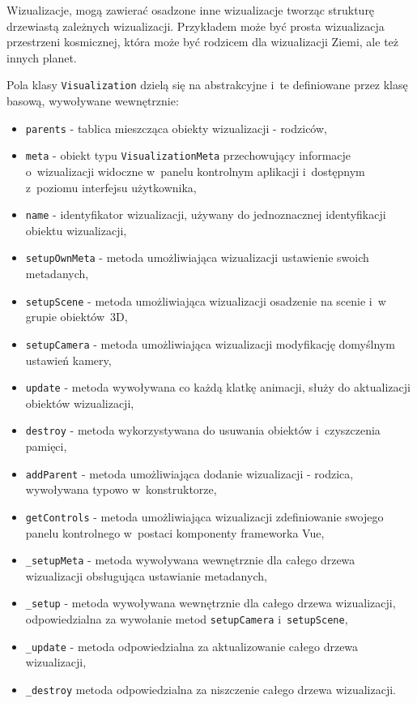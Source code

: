 Wizualizacje, mogą zawierać osadzone inne wizualizacje tworząc strukturę drzewiastą zależnych wizualizacji. Przykładem może być prosta wizualizacja przestrzeni kosmicznej, która może być rodzicem dla wizualizacji Ziemi, ale też innych planet.
\begin{samepage}
    Pola klasy \texttt{Visualization} dzielą się na abstrakcyjne i~te definiowane przez klasę basową, wywoływane wewnętrznie:


    \begin{itemize}
        \item \texttt{parents} - tablica mieszcząca obiekty wizualizacji - rodziców,
        \item \texttt{meta} - obiekt typu \texttt{VisualizationMeta} przechowujący informacje o~wizualizacji widoczne w~panelu kontrolnym aplikacji i~dostępnym z~poziomu interfejsu użytkownika,
        \item \texttt{name} - identyfikator wizualizacji, używany do jednoznacznej identyfikacji obiektu wizualizacji,
        \item \texttt{setupOwnMeta} - metoda umożliwiająca wizualizacji ustawienie swoich metadanych,
        \item \texttt{setupScene} - metoda umożliwiająca wizualizacji osadzenie na scenie i~w grupie obiektów~3D,
        \item \texttt{setupCamera} - metoda umożliwiająca wizualizacji modyfikację domyślnym ustawień kamery,
        \item \texttt{update} - metoda wywoływana co każdą klatkę animacji, służy do aktualizacji obiektów wizualizacji,
        \item \texttt{destroy} - metoda wykorzystywana do usuwania obiektów i~czyszczenia pamięci,
        \item \texttt{addParent} - metoda umożliwiająca dodanie wizualizacji - rodzica, wywoływana typowo w~konstruktorze,
        \item \texttt{getControls} - metoda umożliwiająca wizualizacji zdefiniowanie swojego panelu kontrolnego w~postaci komponenty frameworka Vue,
        \item \texttt{\_setupMeta} - metoda wywoływana wewnętrznie dla całego drzewa wizualizacji obsługująca ustawianie metadanych,
        \item \texttt{\_setup} - metoda wywoływana wewnętrznie dla całego drzewa wizualizacji, odpowiedzialna za wywołanie metod \texttt{setupCamera} i~\texttt{setupScene},
        \item \texttt{\_update} - metoda odpowiedzialna za aktualizowanie całego drzewa wizualizacji,
        \item \texttt{\_destroy} metoda odpowiedzialna za niszczenie całego drzewa wizualizacji.
    \end{itemize}
\end{samepage}

